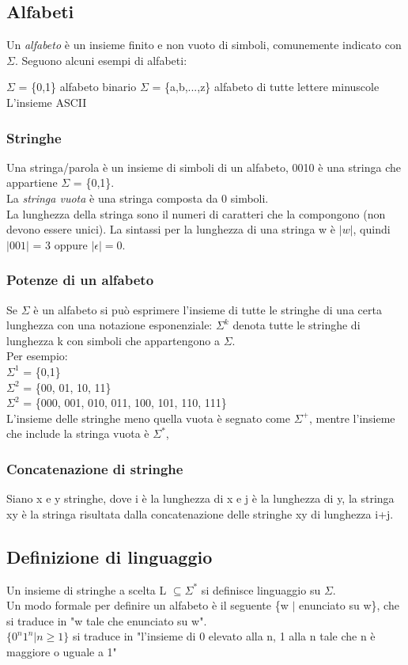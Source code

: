 \documentclass[12pt]{article}
\begin{document}
\subsection{Alfabeti}
Un \emph{alfabeto} è un insieme finito e non vuoto di simboli, comunemente indicato con $\Sigma$. Seguono alcuni esempi di alfabeti: 
\begin{outline}
  \1 $\Sigma$ = \{0,1\} alfabeto binario
  \1 $\Sigma$ = \{a,b,...,z\} alfabeto di tutte lettere minuscole
  \1 L'insieme ASCII
\end{outline}

\subsubsection{Stringhe}
Una stringa/parola è un insieme di simboli di un alfabeto, 0010 è una stringa che appartiene $\Sigma$ = \{0,1\}.
\\ La \emph{stringa vuota} è una stringa composta da 0 simboli.
\\ La lunghezza della stringa sono il numeri di caratteri che la compongono (non devono essere unici). La sintassi per la lunghezza di una stringa w è $|w|$, quindi $|001|$ = 3 oppure $|\epsilon| = 0.$

\subsubsection*{Potenze di un alfabeto}
Se $\Sigma$ è un alfabeto si può esprimere l'insieme di tutte le stringhe di una certa lunghezza con una notazione esponenziale: $\Sigma^k$ denota tutte le stringhe di lunghezza k con simboli che appartengono a $\Sigma$. \\
Per esempio: 
\\ $\Sigma^1$ = \{0,1\} 
\\ $\Sigma^2$ = \{00, 01, 10, 11\}
\\ $\Sigma^2$ = \{000, 001, 010, 011, 100, 101, 110, 111\}
\\ L'insieme delle stringhe meno quella vuota è segnato come $\Sigma^+$, mentre l'insieme che include la stringa vuota è $\Sigma^*$,

\subsubsection{Concatenazione di stringhe}
Siano x e y stringhe, dove i è la lunghezza di x e j è la lunghezza di y, la stringa xy è la stringa risultata dalla concatenazione delle stringhe xy di lunghezza i+j.

\subsection{Definizione di linguaggio}
Un insieme di stringhe a scelta L $\subseteq\Sigma^*$ si definisce linguaggio su $\Sigma$. 
\\ Un modo formale per definire un alfabeto è il seguente \{w $|$ enunciato su w\}, che si traduce in "w tale che enunciato su w".
\\ $\{0^n 1^n | n \ge 1 \}$ si traduce in "l’insieme di 0 elevato alla n, 1 alla n tale che n è maggiore o uguale a 1" 
\end{document}
